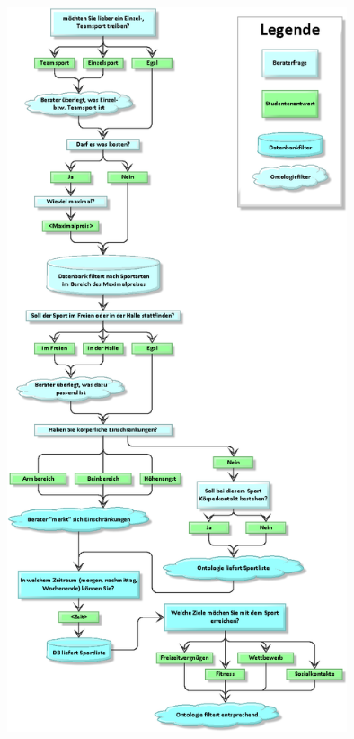 \begin{capfigure}[Szenario 1]
	\includegraphics[width=100mm]{images/szenario1.png}
\end{capfigure}

